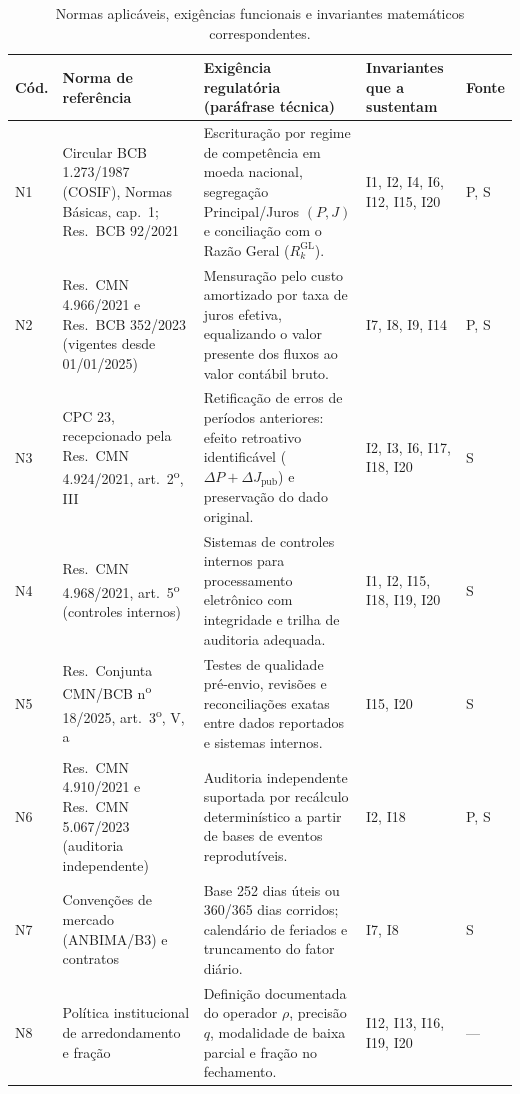 \documentclass[11pt, a4paper]{article}
\theoremstyle{definition}
\theoremstyle{plain}
\theoremstyle{remark}
\begin{document}
\begin{table}[htbp]
\centering
\footnotesize
\renewcommand{\arraystretch}{1.25}
\begin{tabularx}{\textwidth}{@{}l >{\raggedright\arraybackslash}p{3.6cm} X >{\raggedright\arraybackslash}p{2.4cm} l@{}}
\toprule
\textbf{Cód.} & \textbf{Norma de referência} & \textbf{Exigência regulatória (paráfrase técnica)} & \textbf{Invariantes que a sustentam} & \textbf{Fonte} \\
\midrule
N1 & Circular BCB 1.273/1987 (COSIF), Normas Básicas, cap.\ 1; Res.\ BCB 92/2021 & Escrituração por regime de competência em moeda nacional, segregação Principal/Juros $(P, J)$ e conciliação com o Razão Geral ($R_k^{\text{GL}}$). & I1, I2, I4, I6, I12, I15, I20 & P, S \\
N2 & Res.\ CMN 4.966/2021 e Res.\ BCB 352/2023 (vigentes desde 01/01/2025) & Mensuração pelo custo amortizado por taxa de juros efetiva, equalizando o valor presente dos fluxos ao valor contábil bruto. & I7, I8, I9, I14 & P, S \\
N3 & CPC 23, recepcionado pela Res.\ CMN 4.924/2021, art.\ 2\textsuperscript{o}, III & Retificação de erros de períodos anteriores: efeito retroativo identificável ($\Delta P + \Delta J_{\text{pub}}$) e preservação do dado original. & I2, I3, I6, I17, I18, I20 & S \\
N4 & Res.\ CMN 4.968/2021, art.\ 5\textsuperscript{o} (controles internos) & Sistemas de controles internos para processamento eletrônico com integridade e trilha de auditoria adequada. & I1, I2, I15, I18, I19, I20 & S \\
N5 & Res.\ Conjunta CMN/BCB n\textsuperscript{o} 18/2025, art.\ 3\textsuperscript{o}, V, a & Testes de qualidade pré-envio, revisões e reconciliações exatas entre dados reportados e sistemas internos. & I15, I20 & S \\
N6 & Res.\ CMN 4.910/2021 e Res.\ CMN 5.067/2023 (auditoria independente) & Auditoria independente suportada por recálculo determinístico a partir de bases de eventos reprodutíveis. & I2, I18 & P, S \\
N7 & Convenções de mercado (ANBIMA/B3) e contratos & Base 252 dias úteis ou 360/365 dias corridos; calendário de feriados e truncamento do fator diário. & I7, I8 & S \\
N8 & Política institucional de arredondamento e fração & Definição documentada do operador $\rho$, precisão $q$, modalidade de baixa parcial e fração no fechamento. & I12, I13, I16, I19, I20 & --- \\
\bottomrule
\end{tabularx}
\caption{Normas aplicáveis, exigências funcionais e invariantes matemáticos correspondentes.}
\label{tab:9}
\end{table}
\end{document}
